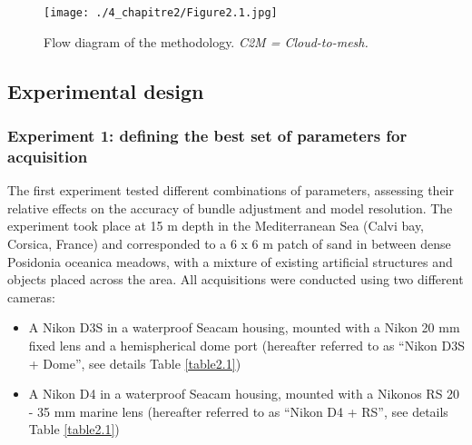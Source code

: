 \begin{figure}[H]
	\begin{center}
	\texttt{[image: ./4\_chapitre2/Figure2.1.jpg]}
		\caption[Flow diagram of the methodology.]{Flow diagram of the methodology. \textit{C2M = Cloud-to-mesh.}}
	\label{figure2.1}
	
\end{center}
\end{figure}

\subsection{Experimental design}\label{chapitre2_2.1}

\subsubsection{Experiment 1: defining the best set of parameters for acquisition}\label{chapitre2_2.1.1}

The first experiment tested different combinations of parameters, assessing their relative effects on the accuracy of bundle adjustment and model resolution. The experiment took place at 15 m depth in the Mediterranean Sea (Calvi bay, Corsica, France) and corresponded to a 6 x 6 m patch of sand in between dense Posidonia oceanica meadows, with a mixture of existing artificial structures and objects placed across the area. All acquisitions were conducted using two different cameras: 

\begin{itemize}[leftmargin=*]
\item A Nikon D3S in a waterproof Seacam housing, mounted with a Nikon 20 mm fixed lens and a hemispherical dome port (hereafter referred to as “Nikon D3S + Dome”, see details Table \ref{table2.1})
\item A Nikon D4 in a waterproof Seacam housing, mounted with a Nikonos RS 20 - 35 mm marine lens (hereafter referred to as “Nikon D4 + RS”, see details Table \ref{table2.1})
\end{itemize}

